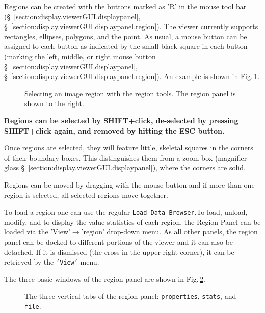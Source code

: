   Regions can be created with the buttons marked as 'R' in the mouse
  tool bar (\S~\ref{section:display.viewerGUI.displaypanel},
  \S~\ref{section:display.viewerGUI.displaypanel.region}). The viewer
  currently supports rectangles, ellipses, polygons, and the point. As
  usual, a mouse button can be assigned to each button as indicated by
  the small black square in each button (marking the left, middle, or
  right mouse button \S~\ref{section:display.viewerGUI.displaypanel},
  \S~\ref{section:display.viewerGUI.displaypanel.region}). An example
  is shown in Fig.\,\ref{fig:viewer_regions}.


\begin{figure}[h!]
\begin{center}
\caption{\label{fig:viewer_regions} Selecting an image region with the
region tools. The region panel is shown to the right.}
\hrulefill
\end{center}
\end{figure}

{\bf Regions can be selected by SHIFT+click, de-selected by pressing
  SHIFT+click again, and removed by hitting the ESC button. }


Once regions are selected, they will feature little, skeletal squares
in the corners of their boundary boxes. This distinguishes them from a
zoom box (magnifier
glass \S~\ref{section:display.viewerGUI.displaypanel}), where the
corners are solid. 

Regions can be moved by dragging with the mouse button and if more
than one region is selected, all selected regions move together.

To load a region one can use the regular {\tt Load Data Browser}.To
load, unload, modify, and to display the value statistics of each
region, the Region Panel can be loaded via the
'View'$\rightarrow$'region' drop-down menu. As all other panels, the
region panel can be docked to different portions of the viewer and it
can also be detached. If it is dismissed (the cross in the upper right
corner), it can be retrieved by the {\tt 'View'} menu.

The three basic windows of the region panel are shown in
Fig.\,\ref{fig:viewer_regionpanel}.

\begin{figure}[h!]
\begin{center}
\caption{\label{fig:viewer_regionpanel} The three vertical tabs of the
region panel: {\tt properties}, {\tt stats}, and {\tt file}.}
\hrulefill
\end{center}
\end{figure}

